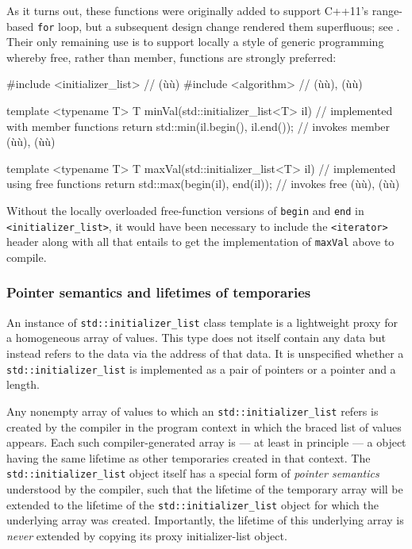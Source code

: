 \noindent As it turns out, these functions were originally added to support
C++11's range-based \lstinline!for! loop, but a subsequent design change
rendered them superfluous; see . Their only remaining use is to
support locally a style of generic programming whereby free, rather than
member, functions are strongly preferred:

\begin{emcppslisting}
#include <initializer_list>  // (ù{}ù)
#include <algorithm>         // (ù{}ù), (ù{}ù)

template <typename T>
T minVal(std::initializer_list<T> il)  // implemented with member functions
{
    return std::min(il.begin(), il.end());  // invokes member (ù{}ù), (ù{}ù)
}

template <typename T>
T maxVal(std::initializer_list<T> il)  // implemented using free functions
{
    return std::max(begin(il), end(il));  // invokes free (ù{}ù), (ù{}ù)
}
\end{emcppslisting}
    

\noindent Without the locally overloaded free-function versions of \lstinline!begin!
and \lstinline!end! in \lstinline!<initializer_list>!, it would have been
necessary to include the \lstinline!<iterator>! header along with all that
entails to get the implementation of \lstinline!maxVal! above to compile.

\subsubsection[Pointer semantics and lifetimes of temporaries]{Pointer semantics and lifetimes of temporaries}\label{pointer-semantics-and-lifetimes-of-temporaries}

An instance of \lstinline!std::initializer_list! class template is a
lightweight proxy for a homogeneous array of values. This type does not
itself contain any data but instead refers to the data via the address
of that data. It is unspecified whether a
\lstinline!std::initializer_list! is implemented as a pair of pointers or
a pointer and a length.

Any nonempty array of values to which an \lstinline!std::initializer_list!
refers is created by the compiler in the program context in which the
braced list of values appears. Each such compiler-generated array is ---
at least in principle --- a  object having the same
lifetime as other temporaries created in that context. The
\lstinline!std::initializer_list! object itself has a special form of
\emph{pointer semantics} understood by the compiler, such that the
lifetime of the temporary array will be extended to the lifetime of the
\lstinline!std::initializer_list! object for which the underlying array
was created. Importantly, the lifetime of this underlying array is
\emph{never} extended by copying its proxy initializer-list object.

